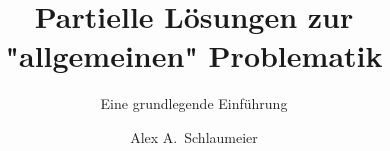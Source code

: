 \documentclass[type=master,degree=engineering,theme=default,language=german,titlelanguage=german,smartquotes=true,aiusage=detailed]{hgbthesis}
\begin{document}


\title{Partielle Lösungen zur "allgemeinen" Problematik}
\subtitle{Eine grundlegende Einführung}
\author{Alex A.\ Schlaumeier}







\frontmatter                                       %

\maketitle
\tableofcontents

		


\mainmatter                             %









\end{document}
